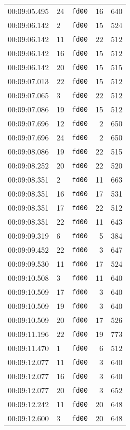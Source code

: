 \documentclass{article}
\begin{document}
\begin{longtable}{lllrr}
00:09:05.495 & 24 & \texttt{fd00} & 16 & 640 \\
00:09:06.142 & 2 & \texttt{fd00} & 15 & 524 \\
00:09:06.142 & 11 & \texttt{fd00} & 22 & 512 \\
00:09:06.142 & 16 & \texttt{fd00} & 15 & 512 \\
00:09:06.142 & 20 & \texttt{fd00} & 15 & 515 \\
00:09:07.013 & 22 & \texttt{fd00} & 15 & 512 \\
00:09:07.065 & 3 & \texttt{fd00} & 22 & 512 \\
00:09:07.086 & 19 & \texttt{fd00} & 15 & 512 \\
00:09:07.696 & 12 & \texttt{fd00} & 2 & 650 \\
00:09:07.696 & 24 & \texttt{fd00} & 2 & 650 \\
00:09:08.086 & 19 & \texttt{fd00} & 22 & 515 \\
00:09:08.252 & 20 & \texttt{fd00} & 22 & 520 \\
00:09:08.351 & 2 & \texttt{fd00} & 11 & 663 \\
00:09:08.351 & 16 & \texttt{fd00} & 17 & 531 \\
00:09:08.351 & 17 & \texttt{fd00} & 22 & 512 \\
00:09:08.351 & 22 & \texttt{fd00} & 11 & 643 \\
00:09:09.319 & 6 & \texttt{fd00} & 5 & 384 \\
00:09:09.452 & 22 & \texttt{fd00} & 3 & 647 \\
00:09:09.530 & 11 & \texttt{fd00} & 17 & 524 \\
00:09:10.508 & 3 & \texttt{fd00} & 11 & 640 \\
00:09:10.509 & 17 & \texttt{fd00} & 3 & 640 \\
00:09:10.509 & 19 & \texttt{fd00} & 3 & 640 \\
00:09:10.509 & 20 & \texttt{fd00} & 17 & 526 \\
00:09:11.196 & 22 & \texttt{fd00} & 19 & 773 \\
00:09:11.470 & 1 & \texttt{fd00} & 6 & 512 \\
00:09:12.077 & 11 & \texttt{fd00} & 3 & 640 \\
00:09:12.077 & 16 & \texttt{fd00} & 3 & 640 \\
00:09:12.077 & 20 & \texttt{fd00} & 3 & 652 \\
00:09:12.242 & 11 & \texttt{fd00} & 20 & 648 \\
00:09:12.600 & 3 & \texttt{fd00} & 20 & 648 \\

\end{longtable}
\end{document}
